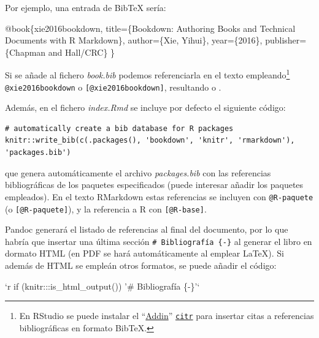 \documentclass[]{book}
\newenvironment{Shaded}{\begin{snugshade}}{\end{snugshade}}
\newcommand{\DataTypeTok}[1]{\textcolor[rgb]{0.13,0.29,0.53}{#1}}
\newcommand{\BaseNTok}[1]{\textcolor[rgb]{0.00,0.00,0.81}{#1}}
\newcommand{\OtherTok}[1]{\textcolor[rgb]{0.56,0.35,0.01}{#1}}
\newcommand{\VariableTok}[1]{\textcolor[rgb]{0.00,0.00,0.00}{#1}}
\newcommand{\NormalTok}[1]{#1}
\let\rmarkdownfootnote\footnote%
\def\footnote{\protect\rmarkdownfootnote}
\theoremstyle{definition}
\theoremstyle{definition}
\theoremstyle{definition}
\theoremstyle{remark}
\begin{document}
Por ejemplo, una entrada de BibTeX sería:

\begin{Shaded}
\begin{Highlighting}[]
\VariableTok{@book}\NormalTok{\{}\OtherTok{xie2016bookdown}\NormalTok{,}
  \DataTypeTok{title}\NormalTok{=\{Bookdown: Authoring Books and Technical Documents with R Markdown\},}
  \DataTypeTok{author}\NormalTok{=\{Xie, Yihui\},}
  \DataTypeTok{year}\NormalTok{=\{2016\},}
  \DataTypeTok{publisher}\NormalTok{=\{Chapman and Hall/CRC\}}
\NormalTok{\}}
\end{Highlighting}
\end{Shaded}

Si se añade al fichero \emph{book.bib} podemos referenciarla en el texto
empleando\footnote{En RStudio se puede instalar el
  ``\href{https://rstudio.github.io/rstudioaddins/}{Addin}''
  \href{https://github.com/crsh/citr}{\texttt{citr}} para insertar citas
  a referencias bibliográficas en formato BibTeX.}
\texttt{@xie2016bookdown} o \texttt{{[}@xie2016bookdown{]}}, resultando
\citet{xie2016bookdown} o \citep{xie2016bookdown}.

Además, en el fichero \emph{index.Rmd} se incluye por defecto el
siguiente código:

\begin{verbatim}
# automatically create a bib database for R packages
knitr::write_bib(c(.packages(), 'bookdown', 'knitr', 'rmarkdown'), 'packages.bib')
\end{verbatim}

que genera automáticamente el archivo \emph{packages.bib} con las
referencias bibliográficas de los paquetes especificados (puede
interesar añadir los paquetes empleados). En el texto RMarkdown estas
referencias se incluyen con \texttt{@R-paquete} (o
\texttt{{[}@R-paquete{]}}), y la referencia a R \citep{R-base} con
\texttt{{[}@R-base{]}}.

Pandoc generará el listado de referencias al final del documento, por lo
que habría que insertar una última sección
\texttt{\#\ Bibliografía\ \{-\}} al generar el libro en dormato HTML (en
PDF se hará automáticamente al emplear LaTeX). Si además de HTML se
empleán otros formatos, se puede añadir el código:

\begin{Shaded}
\begin{Highlighting}[]
\BaseNTok{`r if (knitr:::is_html_output()) '# Bibliografía \{-\}'`}
\end{Highlighting}
\end{Shaded}
\end{document}
